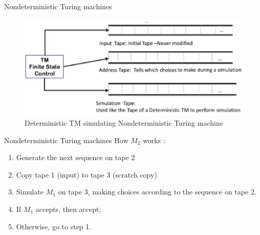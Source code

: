 \documentclass{beamer}
\begin{document}
\begin{frame}{Nondeterministic Turing machines}
		\begin{figure}
		\includegraphics[scale=.5]{img5/m19}
		\caption{Deterministic TM simulating Nondeterministic Turing machine}
	\end{figure}
\end{frame}
\begin{frame}{Nondeterministic Turing machines}
	How $M_2$ works :
	\begin{enumerate}
		\item Generate the next sequence on tape 2
		\item Copy tape 1 (input) to tape 3 (scratch copy)
		\item Simulate $M_1$ on tape 3, making choices according 
		to the sequence on tape 2.
		\item If $M_1$ accepts, then accept;
		\item Otherwise, go to step 1.
	\end{enumerate}
\end{frame}
\end{document}
